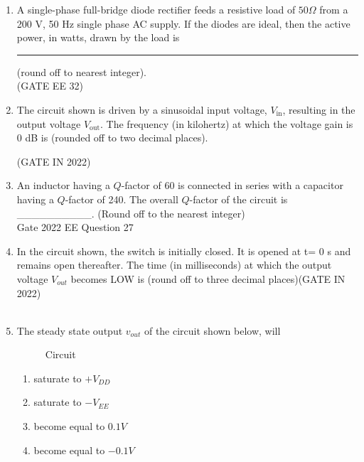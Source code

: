 \begin{enumerate}[label=\thechapter.\arabic*,ref=\thechapter.\theenumi]
\solution

\pagebreak

\item A single-phase full-bridge diode rectifier feeds a resistive load of $50 \Omega$ from a 200 V,
50 Hz single phase AC supply. If the diodes are ideal, then the active power, in watts,
drawn by the load is \rule{1cm}{0.5mm} (round off to nearest integer).  \\
\hfill (GATE EE 32)\\
\solution

\pagebreak

\item The circuit shown is driven by a sinusoidal input voltage, $V_{\text{in}}$, resulting in the output voltage $V_{\text{out}}$. The frequency (in kilohertz) at which the voltage gain is 0 dB is (rounded off to two decimal places).
\begin{figure}[htb]
  \centering
  
\end{figure}
\hfill(GATE IN 2022)\\
\solution

\pagebreak

\item An inductor having a $Q$-factor of 60 is connected in series with a capacitor having a $Q$-factor of 240. The overall $Q$-factor of the circuit is \_\_\_\_\_\_\_\_\_\_. (Round off to the nearest integer) \\
\hfill Gate 2022 EE Question 27\\
\solution

\pagebreak

\item In the circuit shown, the switch is initially closed. It is opened at t= 0 s and
remains open thereafter. The time (in milliseconds) at which the output voltage
$V_{out}$ becomes LOW is  (round off to three decimal places)\hfill(GATE IN 2022)\\

\solution\\

\pagebreak

\item The steady state output $v_{out}$ of the circuit shown below, will
\begin{figure}[h]
    \centering
    
    \caption{Circuit}
    \label{fig: 217.EE.16.1}
\end{figure}

\begin{enumerate}
    \item saturate to $+V_{DD}$
    \item saturate to $-V_{EE}$
    \item become equal to $0.1V$
    \item become equal to $-0.1V$
\end{enumerate}
\solution

\pagebreak


\end{enumerate}
